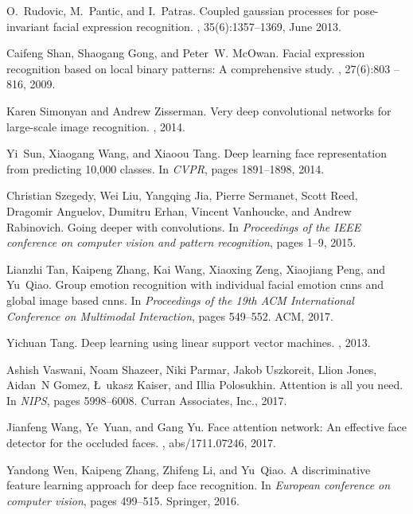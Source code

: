 \documentclass[journal]{IEEEtran}
\begin{document}
\begin{thebibliography}{10}
O.~Rudovic, M.~Pantic, and I.~Patras.
\newblock Coupled gaussian processes for pose-invariant facial expression
recognition.
, 35(6):1357--1369, June 2013.

Caifeng Shan, Shaogang Gong, and Peter~W. McOwan.
\newblock Facial expression recognition based on local binary patterns: A
comprehensive study.
, 27(6):803 -- 816, 2009.

Karen Simonyan and Andrew Zisserman.
\newblock Very deep convolutional networks for large-scale image recognition.
, 2014.

Yi~Sun, Xiaogang Wang, and Xiaoou Tang.
\newblock Deep learning face representation from predicting 10,000 classes.
\newblock In {\em CVPR}, pages 1891--1898, 2014.

Christian Szegedy, Wei Liu, Yangqing Jia, Pierre Sermanet, Scott Reed, Dragomir
Anguelov, Dumitru Erhan, Vincent Vanhoucke, and Andrew Rabinovich.
\newblock Going deeper with convolutions.
\newblock In {\em Proceedings of the IEEE conference on computer vision and
	pattern recognition}, pages 1--9, 2015.

Lianzhi Tan, Kaipeng Zhang, Kai Wang, Xiaoxing Zeng, Xiaojiang Peng, and
Yu~Qiao.
\newblock Group emotion recognition with individual facial emotion cnns and
global image based cnns.
\newblock In {\em Proceedings of the 19th ACM International Conference on
	Multimodal Interaction}, pages 549--552. ACM, 2017.

Yichuan Tang.
\newblock Deep learning using linear support vector machines.
, 2013.

Ashish Vaswani, Noam Shazeer, Niki Parmar, Jakob Uszkoreit, Llion Jones,
Aidan~N Gomez, \L~ukasz Kaiser, and Illia Polosukhin.
\newblock Attention is all you need.
\newblock In {\em NIPS}, pages 5998--6008. Curran Associates, Inc., 2017.

Jianfeng Wang, Ye~Yuan, and Gang Yu.
\newblock Face attention network: An effective face detector for the occluded
faces.
, abs/1711.07246, 2017.

Yandong Wen, Kaipeng Zhang, Zhifeng Li, and Yu~Qiao.
\newblock A discriminative feature learning approach for deep face recognition.
\newblock In {\em European conference on computer vision}, pages 499--515.
Springer, 2016.


\end{thebibliography}
\end{document}
